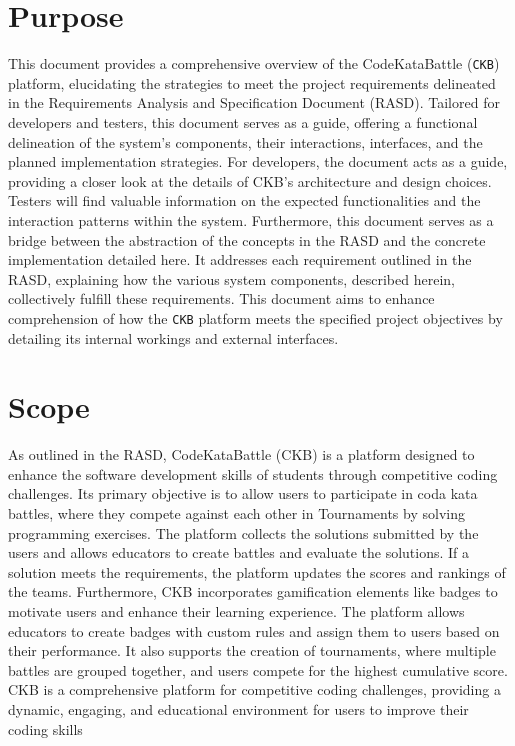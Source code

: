 \section{Purpose}
\label{sec:purpose}
This document provides a comprehensive overview of the CodeKataBattle (\verb|CKB|) platform, elucidating the strategies to meet the project requirements delineated in the Requirements Analysis and Specification Document (RASD). 
Tailored for developers and testers, this document serves as a guide, offering a functional delineation of the system's components, their interactions, interfaces, and the planned implementation strategies.
For developers, the document acts as a guide, providing a closer look at the details of CKB's architecture and design choices.
Testers will find valuable information on the expected functionalities and the interaction patterns within the system.
Furthermore, this document serves as a bridge between the abstraction of the concepts in the RASD and the concrete implementation detailed here. 
It addresses each requirement outlined in the RASD, explaining how the various system components, described herein, collectively fulfill these requirements. 
This document aims to enhance comprehension of how the \verb|CKB| platform meets the specified project objectives by detailing its internal workings and external interfaces.

\section{Scope}
\label{sec:scope}
As outlined in the RASD, CodeKataBattle (CKB) is a platform designed to enhance the software development skills of students through 
competitive coding challenges. Its primary objective is to allow users to participate in coda kata battles, 
where they compete against each other in Tournaments by solving programming exercises. 
The platform collects the solutions submitted by the users and allows educators to create battles and evaluate the solutions. 
If a solution meets the requirements, the platform updates the scores and rankings of the teams. \newline
Furthermore, CKB incorporates gamification elements like badges to motivate users and enhance their learning experience. 
The platform allows educators to create badges with custom rules and assign them to users based on their performance. 
It also supports the creation of tournaments, where multiple battles are grouped together, and users compete for the highest cumulative score.\newline
CKB is a comprehensive platform for competitive coding challenges, providing a dynamic, engaging, and educational environment for users to improve their coding skills

